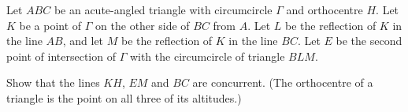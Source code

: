 Let $ABC$ be an acute-angled triangle with circumcircle $\Gamma$ and orthocentre $H$. Let $K$ be a point of $\Gamma$ on the other side of $BC$ from $A$. Let $L$ be the reflection of $K$ in the line $AB$, and let $M$ be the reflection of $K$ in the line $BC$. Let $E$ be the second point of intersection of $\Gamma$ with the circumcircle of triangle $BLM$.

Show that the lines $KH$, $EM$ and $BC$ are concurrent. (The orthocentre of a triangle is the point on all three of its altitudes.)
